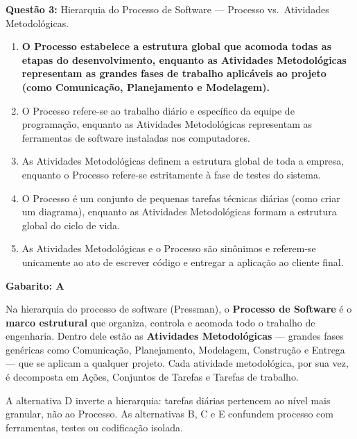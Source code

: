 \documentclass[12pt,a4paper]{article}
\begin{document}
\vspace{0.6cm}

\textbf{Questão 3:} Hierarquia do Processo de Software — Processo vs.\ Atividades Metodológicas.

\begin{enumerate}[label=\textbf{\Alph*)}, itemsep=0.2cm]
    \item[\textbf{A)}] \textbf{O Processo estabelece a estrutura global que acomoda todas as etapas do desenvolvimento, enquanto as Atividades Metodológicas representam as grandes fases de trabalho aplicáveis ao projeto (como Comunicação, Planejamento e Modelagem).} \checkmark
    \item O Processo refere-se ao trabalho diário e específico da equipe de programação, enquanto as Atividades Metodológicas representam as ferramentas de software instaladas nos computadores.
    \item As Atividades Metodológicas definem a estrutura global de toda a empresa, enquanto o Processo refere-se estritamente à fase de testes do sistema.
    \item O Processo é um conjunto de pequenas tarefas técnicas diárias (como criar um diagrama), enquanto as Atividades Metodológicas formam a estrutura global do ciclo de vida.
    \item As Atividades Metodológicas e o Processo são sinônimos e referem-se unicamente ao ato de escrever código e entregar a aplicação ao cliente final.
\end{enumerate}

\begin{tcolorbox}[respostabox]
\textbf{Gabarito: A}

Na hierarquia do processo de software (Pressman), o \textbf{Processo de Software} é o \textbf{marco estrutural} que organiza, controla e acomoda todo o trabalho de engenharia. Dentro dele estão as \textbf{Atividades Metodológicas} --- grandes fases genéricas como Comunicação, Planejamento, Modelagem, Construção e Entrega --- que se aplicam a qualquer projeto. Cada atividade metodológica, por sua vez, é decomposta em Ações, Conjuntos de Tarefas e Tarefas de trabalho.

A alternativa D inverte a hierarquia: tarefas diárias pertencem ao nível mais granular, não ao Processo. As alternativas B, C e E confundem processo com ferramentas, testes ou codificação isolada.
\end{tcolorbox}
\end{document}
